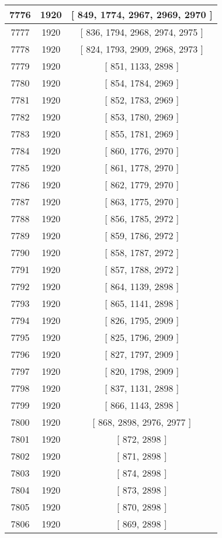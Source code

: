 \begin{center}
\begin{longtable}[H]{|| c c c ||}
\hline
7776 & 1920 & [ 849, 1774, 2967, 2969, 2970 ] \\ 
\hline
7777 & 1920 & [ 836, 1794, 2968, 2974, 2975 ] \\ 
\hline
7778 & 1920 & [ 824, 1793, 2909, 2968, 2973 ] \\ 
\hline
7779 & 1920 & [ 851, 1133, 2898 ] \\ 
\hline
7780 & 1920 & [ 854, 1784, 2969 ] \\ 
\hline
7781 & 1920 & [ 852, 1783, 2969 ] \\ 
\hline
7782 & 1920 & [ 853, 1780, 2969 ] \\ 
\hline
7783 & 1920 & [ 855, 1781, 2969 ] \\ 
\hline
7784 & 1920 & [ 860, 1776, 2970 ] \\ 
\hline
7785 & 1920 & [ 861, 1778, 2970 ] \\ 
\hline
7786 & 1920 & [ 862, 1779, 2970 ] \\ 
\hline
7787 & 1920 & [ 863, 1775, 2970 ] \\ 
\hline
7788 & 1920 & [ 856, 1785, 2972 ] \\ 
\hline
7789 & 1920 & [ 859, 1786, 2972 ] \\ 
\hline
7790 & 1920 & [ 858, 1787, 2972 ] \\ 
\hline
7791 & 1920 & [ 857, 1788, 2972 ] \\ 
\hline
7792 & 1920 & [ 864, 1139, 2898 ] \\ 
\hline
7793 & 1920 & [ 865, 1141, 2898 ] \\ 
\hline
7794 & 1920 & [ 826, 1795, 2909 ] \\ 
\hline
7795 & 1920 & [ 825, 1796, 2909 ] \\ 
\hline
7796 & 1920 & [ 827, 1797, 2909 ] \\ 
\hline
7797 & 1920 & [ 820, 1798, 2909 ] \\ 
\hline
7798 & 1920 & [ 837, 1131, 2898 ] \\ 
\hline
7799 & 1920 & [ 866, 1143, 2898 ] \\ 
\hline
7800 & 1920 & [ 868, 2898, 2976, 2977 ] \\ 
\hline
7801 & 1920 & [ 872, 2898 ] \\ 
\hline
7802 & 1920 & [ 871, 2898 ] \\ 
\hline
7803 & 1920 & [ 874, 2898 ] \\ 
\hline
7804 & 1920 & [ 873, 2898 ] \\ 
\hline
7805 & 1920 & [ 870, 2898 ] \\ 
\hline
7806 & 1920 & [ 869, 2898 ] \\ 

\end{longtable}
\end{center}
